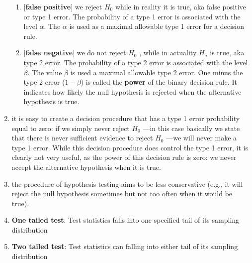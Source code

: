 \begin{enumerate}
\begin{enumerate}
        \item {[\textbf{false positive}]} we reject $H_0$ while in reality it is true, aka false positive or type 1 error.
        The probability of a type 1 error is associated with the level $\alpha$.
        The $\alpha$ is used as a maximal allowable type 1 error for a decision rule.
        \hfill \cite{statistics/book/Statistics-for-Data-Scientists/Maurits-Kaptein}

        \item {[\textbf{false negative}]} we do not reject $H_0$ , while in actuality $H_a$ is true, aka type 2 error.
        The probability of a type 2 error is associated with the level $\beta$.
        The value $\beta$ is used a maximal allowable type 2 error.
        One minus the type 2 error ($1-\beta$) is called the \textbf{power} of the binary decision rule.
        It indicates how likely the null hypothesis is rejected when the alternative hypothesis is true.
        \hfill \cite{statistics/book/Statistics-for-Data-Scientists/Maurits-Kaptein}
    \end{enumerate}

    \item it is easy to create a decision procedure that has a type 1 error probability equal to zero:
    if we simply never reject $H_0$ —in this case basically we state that there is never sufficient evidence to reject $H_0$ —we will never make a type 1 error.
    While this decision procedure does control the type 1 error, it is clearly not very useful, as the power of this decision rule is zero: we never accept the alternative hypothesis when it is true.
    \hfill \cite{statistics/book/Statistics-for-Data-Scientists/Maurits-Kaptein}

    \item the procedure of hypothesis testing aims to be less conservative (e.g., it will reject the null hypothesis sometimes but not too often when it would be true).
    \hfill \cite{statistics/book/Statistics-for-Data-Scientists/Maurits-Kaptein}

    \item \textbf{One tailed test}: Test statistics falls into one specified tail of its sampling distribution
    \hfill \cite{ctl.unm.edu/assets/docs/resources/hypothesis-testing-sheet.pdf}

    \item \textbf{Two tailed test}: Test statistics can falling into either tail of its sampling distribution
    \hfill \cite{ctl.unm.edu/assets/docs/resources/hypothesis-testing-sheet.pdf}


\end{enumerate}
